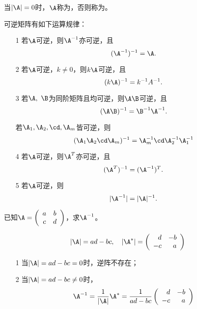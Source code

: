 
\begin{dingyi}[奇异阵与非奇异阵]
  当$|\A|=0$时，$\A$称为，否则称为。
\end{dingyi}


\begin{zhu*}
\end{zhu*}


\begin{dingli}可逆矩阵有如下运算规律：
  \begin{enumerate}
  \item[1] 若$\A$可逆，则$\A^{-1}$亦可逆，且
    $$(\A^{-1})^{-1}=\A.$$
  \item[2] 若$\A$可逆，$k\ne 0$，则$k\A$可逆，且
    $$(k\A)^{-1}= k^{-1}A^{-1}.$$
  \item[3] 若$\A, ~\B$为同阶矩阵且均可逆，则$\A\B$可逆，且
    $$(\A\B)^{-1} = \B^{-1}\A^{-1}.$$
  \item[] 若$\A_1,\A_2,\cd,\A_m$皆可逆，则
    $$
    (\A_1\A_2\cd\A_m)^{-1}=\A_m^{-1}\cd\A_2^{-1}\A_1^{-1}
    $$
  \item[4] 若$\A$可逆，则$\A^T$亦可逆，且
    $$(\A^T)^{-1}=(\A^{-1})^T.$$ 
  \item[5] 若$\A$可逆，则
    $$|\A^{-1}|=|\A|^{-1}.$$
  \end{enumerate}
\end{dingli}


\begin{li}
  已知$\A = \left(
    \begin{array}{cc}
      a & b \\
      c & d
    \end{array}
  \right)$，求$\A^{-1}$。
\end{li}
\begin{jie}

$$
|\A| = ad-bc, \quad
|\A^*| = \left(
  \begin{array}{rr}
    d & -b \\
    -c & a
  \end{array}
\right)
$$

\begin{itemize}
\item[1] 当$|\A|=ad-bc=0$时，逆阵不存在； 
\item[2] 当$|\A|=ad-bc\ne0$时，
  $$
  \A^{-1} = \frac1{|\A|} \A^* = \frac1{ad-bc}\left(
    \begin{array}{rr}
      d & -b \\
      -c & a
    \end{array}
  \right)
  $$
\end{itemize}
\end{jie}

